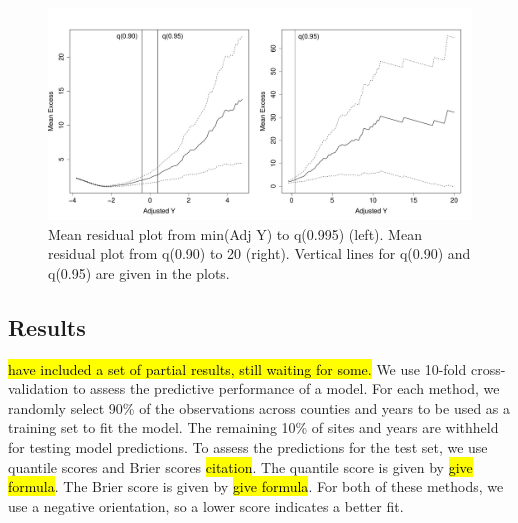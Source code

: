 \documentclass[11pt]{article}
\begin{document}
\begin{figure}[htbp]
  \centering
  \includegraphics[width = \linewidth]{plots/fire-mrl-plots.pdf}  %
  \caption{Mean residual plot from min(Adj Y) to q(0.995) (left). Mean residual plot from q(0.90) to 20 (right). Vertical lines for q(0.90) and q(0.95) are given in the plots.}
  \label{fig:mrlthresh}
\end{figure}


\subsection{Results}\label{s:results}
\hl{have included a set of partial results, still waiting for some.}
We use 10-fold cross-validation to assess the predictive performance of a model.
For each method, we randomly select 90\% of the observations across counties and years to be used as a training set to fit the model.
The remaining 10\% of sites and years are withheld for testing model predictions.
To assess the predictions for the test set, we use quantile scores and Brier scores \hl{citation}.
The quantile score is given by \hl{give formula}.
The Brier score is given by \hl{give formula}.
For both of these methods, we use a negative orientation, so a lower score indicates a better fit.
\end{document}

